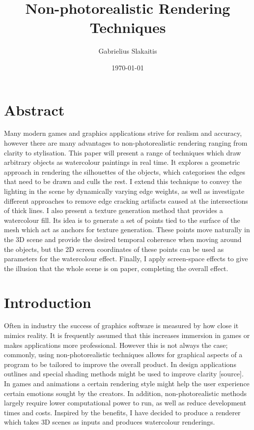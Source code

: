 \documentclass[a4paper, 12pt]{article}
\begin{document}
\title{Non-photorealistic Rendering Techniques}
\author{Gabrielius Slakaitis}
\date{\today}
\maketitle

\newpage



\section{Abstract}

Many modern games and graphics applications strive for realism and accuracy, however there are many advantages to non-photorealistic rendering ranging from clarity to stylisation. This paper will present a range of techniques which draw arbitrary objects as watercolour paintings in real time. It explores a geometric approach in rendering the silhouettes of the objects, which categorises the edges that need to be drawn and culls the rest. I extend this technique to convey the lighting in the scene by dynamically varying edge weights, as well as investigate different approaches to remove edge cracking artifacts caused at the intersections of thick lines. I also present a texture generation method that provides a watercolour fill. Its idea is to generate a set of points tied to the surface of the mesh which act as anchors for texture generation. These points move naturally in the 3D scene and provide the desired temporal coherence when moving around the objects, but the 2D screen coordinates of these points can be used as parameters for the watercolour effect. Finally, I apply screen-space effects to give the illusion that the whole scene is on paper, completing the overall effect.



\section{Introduction}

Often in industry the success of graphics software is measured by how close it mimics reality. It is frequently assumed that this increases immersion in games or makes applications more professional. However this is not always the case; commonly, using non-photorealistic techniques allows for graphical aspects of a program to be tailored to improve the overall product. In design applications outlines and special shading methods might be used to improve clarity [source]. In games and animations a certain rendering style might help the user experience certain emotions sought by the creators. In addition, non-photorealistic methods largely require lower computational power to run, as well as reduce development times and costs. Inspired by the benefits, I have decided to produce a renderer which takes 3D scenes as inputs and produces watercolour renderings.
\end{document}
